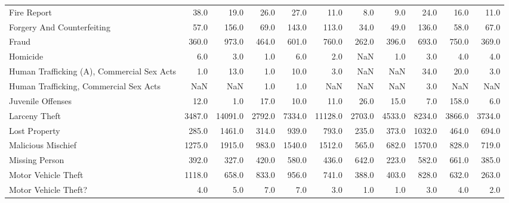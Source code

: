 \documentclass[10pt,parskip=half,
toc=sectionentrywithdots,
bibliography=totocnumbered,
captions=tableheading,numbers=noendperiod]{scrartcl}
\begin{document}
\begin{table}[H]
\begin{adjustbox}{max width=\textwidth}
{\begin{tabular}{lrrrrrrrrrr}
Fire Report                                &     38.0 &     19.0 &       26.0 &     27.0 &      11.0 &     8.0 &       9.0 &      24.0 &     16.0 &        11.0 \\
Forgery And Counterfeiting                 &     57.0 &    156.0 &       69.0 &    143.0 &     113.0 &    34.0 &      49.0 &     136.0 &     58.0 &        67.0 \\
Fraud                                      &    360.0 &    973.0 &      464.0 &    601.0 &     760.0 &   262.0 &     396.0 &     693.0 &    750.0 &       369.0 \\
Homicide                                   &      6.0 &      3.0 &        1.0 &      6.0 &       2.0 &     NaN &       1.0 &       3.0 &      4.0 &         4.0 \\
Human Trafficking (A), Commercial Sex Acts &      1.0 &     13.0 &        1.0 &     10.0 &       3.0 &     NaN &       NaN &      34.0 &     20.0 &         3.0 \\
Human Trafficking, Commercial Sex Acts     &      NaN &      NaN &        1.0 &      1.0 &       NaN &     NaN &       NaN &       3.0 &      NaN &         NaN \\
Juvenile Offenses                          &     12.0 &      1.0 &       17.0 &     10.0 &      11.0 &    26.0 &      15.0 &       7.0 &    158.0 &         6.0 \\
Larceny Theft                              &   3487.0 &  14091.0 &     2792.0 &   7334.0 &   11128.0 &  2703.0 &    4533.0 &    8234.0 &   3866.0 &      3734.0 \\
Lost Property                              &    285.0 &   1461.0 &      314.0 &    939.0 &     793.0 &   235.0 &     373.0 &    1032.0 &    464.0 &       694.0 \\
Malicious Mischief                         &   1275.0 &   1915.0 &      983.0 &   1540.0 &    1512.0 &   565.0 &     682.0 &    1570.0 &    828.0 &       719.0 \\
Missing Person                             &    392.0 &    327.0 &      420.0 &    580.0 &     436.0 &   642.0 &     223.0 &     582.0 &    661.0 &       385.0 \\
Motor Vehicle Theft                        &   1118.0 &    658.0 &      833.0 &    956.0 &     741.0 &   388.0 &     403.0 &     828.0 &    632.0 &       263.0 \\
Motor Vehicle Theft?                       &      4.0 &      5.0 &        7.0 &      7.0 &       3.0 &     1.0 &       1.0 &       3.0 &      4.0 &         2.0 \\

\end{tabular}}
\end{adjustbox}
\end{table}
\end{document}
